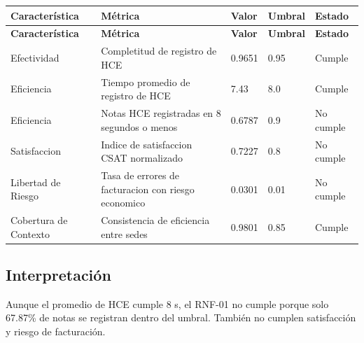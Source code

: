 \documentclass[11pt]{article}
\begin{document}
\small
\begin{longtable}{p{} p{} p{} p{} p{}}
\toprule
\textbf{Característica} & \textbf{Métrica} & \textbf{Valor} & \textbf{Umbral} & \textbf{Estado} \\
\midrule
\endfirsthead
\toprule
\textbf{Característica} & \textbf{Métrica} & \textbf{Valor} & \textbf{Umbral} & \textbf{Estado} \\
\midrule
\endhead
Efectividad & Completitud de registro de HCE & 0.9651 & 0.95 & Cumple \\
Eficiencia & Tiempo promedio de registro de HCE & 7.43 & 8.0 & Cumple \\
Eficiencia & Notas HCE registradas en 8 segundos o menos & 0.6787 & 0.9 & No cumple \\
Satisfaccion & Indice de satisfaccion CSAT normalizado & 0.7227 & 0.8 & No cumple \\
Libertad de Riesgo & Tasa de errores de facturacion con riesgo economico & 0.0301 & 0.01 & No cumple \\
Cobertura de Contexto & Consistencia de eficiencia entre sedes & 0.9801 & 0.85 & Cumple \\
\bottomrule
\end{longtable}
\normalsize

\subsection*{Interpretación}
Aunque el promedio de HCE cumple 8 s, el RNF-01 no cumple porque solo 67.87\% de notas se registran dentro del umbral. También no cumplen satisfacción y riesgo de facturación.
\end{document}
